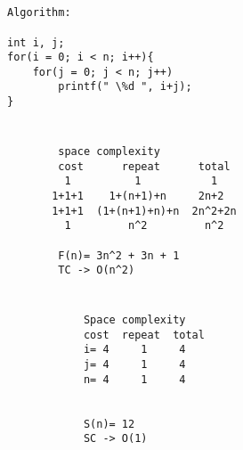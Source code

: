\documentclass{article}
\begin{document}
\hrulefill
\begin{multicols}{3}
    \begin{minipage}{\linewidth}
        \section*{}
        \begin{verbatim}
Algorithm:

int i, j;
for(i = 0; i < n; i++){
    for(j = 0; j < n; j++)
        printf(" \%d ", i+j);
}
        \end{verbatim}
    \end{minipage}
    
    \begin{minipage}{\linewidth}
        \section*{}
        \begin{verbatim}
        space complexity
        cost      repeat      total
         1          1           1
       1+1+1    1+(n+1)+n     2n+2
       1+1+1  (1+(n+1)+n)+n  2n^2+2n
         1         n^2         n^2

        F(n)= 3n^2 + 3n + 1
        TC -> O(n^2)
        \end{verbatim}
    \end{minipage}
    
    \begin{minipage}{\linewidth}
        \section*{}
        \begin{verbatim}
            Space complexity
            cost  repeat  total
            i= 4     1     4
            j= 4     1     4
            n= 4     1     4
            

            S(n)= 12
            SC -> O(1)
        \end{verbatim}
    \end{minipage}
\end{multicols}
\end{document}
